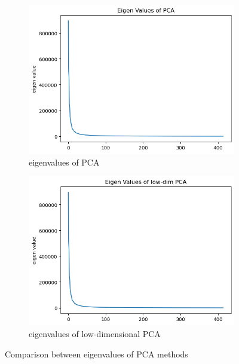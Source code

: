 \begin{figure}[htbp]
	\centering
	\begin{subfigure}[t]{0.4\linewidth}
		\centering
		\includegraphics[width=\linewidth]{image/q1_eigval_pca.png}
		\caption{eigenvalues of PCA}
		\label{fig:eigval_pca}
	\end{subfigure}%
    \hspace{0.2cm}
	\begin{subfigure}[t]{0.4\linewidth}
		\centering
		\includegraphics[width=\linewidth]{image/q1_eigval_lowdim.png}
		\caption{eigenvalues of low-dimensional PCA}
		\label{fig:eigval_lowdim}
	\end{subfigure}
	\caption{Comparison between eigenvalues of PCA methods}
	\label{fig:q1_eigval}
\end{figure}

